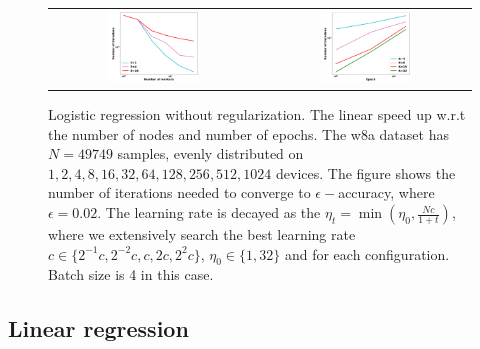 \begin{figure}[h!]
\centering
\begin{tabular}{cc}
	\includegraphics[width=0.45\textwidth]{fig/paper-cvxsmoothspeedupNodesT-min-w8a-epsilon0134-reg0.pdf} & 
\includegraphics[width=0.45\textwidth]{fig/paper-cvxsmoothspeedupEpochsT-min-w8a-epsilon0134-reg0.pdf} \\
\end{tabular}
	\caption{Logistic regression without regularization. The linear speed up w.r.t the number of nodes and number of epochs. The w8a dataset has $N=49749$ samples, evenly distributed on $1, 2, 4, 8, 16, 32, 64, 128, 256, 512, 1024$ devices. The figure shows the number of iterations needed to converge to $\epsilon-$accuracy, where $\epsilon=0.02$. The learning rate is decayed as the $\eta_t = \min(\eta_0, \frac{Nc}{1 + t})$, where we extensively search the best learning rate $c \in \{2^{-1}c, 2^{-2}c, c, 2c, 2^{2}c\}$, $\eta_0 \in \{1, 32\}$ and for each configuration. Batch size is 4 in this case.}
\end{figure}




\subsection{Linear regression}






